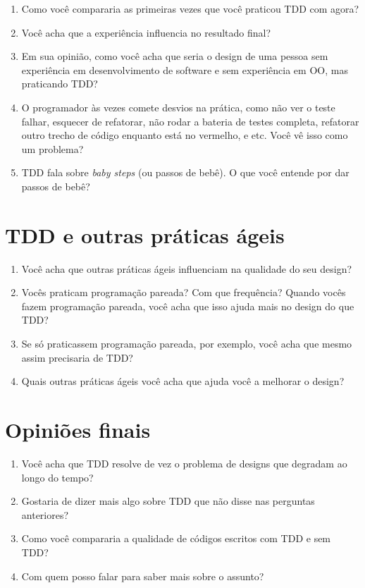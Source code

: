 \begin{enumerate}
	\item Como você compararia as primeiras vezes que você praticou TDD com agora?

	\item Você acha que a experiência influencia no resultado final?

	\item Em sua opinião, como você acha que seria o design de uma pessoa sem
	experiência em desenvolvimento de software e sem experiência em OO, mas praticando TDD?

	\item O programador às vezes comete desvios na prática, como não ver o teste
	falhar,  esquecer de refatorar, não rodar a bateria de testes completa,
	refatorar outro trecho de código enquanto está no vermelho, e etc. Você vê isso
	como um problema?
	
	\item TDD fala sobre \textit{baby steps} (ou passos de bebê). O que você 
	entende por dar passos de bebê?

\end{enumerate}

\section{TDD e outras práticas ágeis}
\label{entrevista:tdd-e-praticas-ageis}

\begin{enumerate}
	\item Você acha que outras práticas ágeis influenciam na qualidade do seu design?

	\item Vocês praticam programação pareada? Com que frequência? Quando vocês
	fazem programação pareada, você acha que isso ajuda mais no design do que TDD?

	\item Se só praticassem programação pareada, por exemplo, você acha que mesmo
	assim precisaria de TDD?

	\item Quais outras práticas ágeis você acha que ajuda você a melhorar o design?
\end{enumerate}

\section{Opiniões finais}

\begin{enumerate}
	\item Você acha que TDD resolve de vez o problema de designs que degradam ao longo do tempo?

	\item Gostaria de dizer mais algo sobre TDD que não disse nas perguntas anteriores?
	
	\item Como você compararia a qualidade de códigos escritos com TDD e sem TDD? 

	\item Com quem posso falar para saber mais sobre o assunto?
\end{enumerate}

